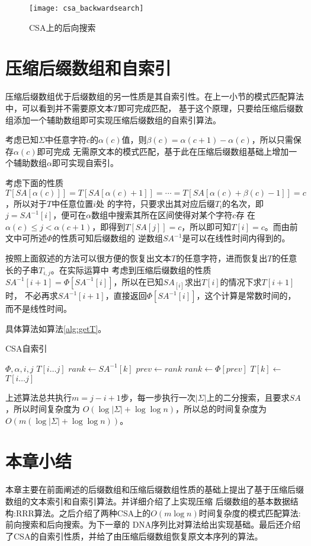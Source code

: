 \begin{figure}[t]
    \centering
    \texttt{[image: csa\_backwardsearch]}
    \caption{CSA上的后向搜索}
    \label{figbackwardsearch}
\end{figure}

\section{压缩后缀数组和自索引}
压缩后缀数组优于后缀数组的另一性质是其自索引性。在上一小节的模式匹配算法中，可以看到并不需要原文本$T$即可完成匹配，
基于这个原理，只要给压缩后缀数组添加一个辅助数组即可实现压缩后缀数组的自索引算法。

考虑已知$\Sigma$中任意字符$c$的$\alpha(c)$值，则$\beta(c)=\alpha(c+1)-\alpha(c)$，所以只需保存$\alpha(c)$即可完成
无需原文本的模式匹配，基于此在压缩后缀数组基础上增加一个辅助数组$\alpha$即可实现自索引。

考虑下面的性质$T[SA[\alpha(c)]]=T[SA[\alpha(c)+1]]=\cdots=T[SA[\alpha(c)+\beta(c)-1]]=c$，所以对于$T$中任意位置$i$处
的字符，只要求出其对应后缀$T_i$的名次，即$j=SA^{-1}[i]$，便可在$\alpha$数组中搜索其所在区间使得对某个字符$c$存
在$\alpha(c)\leq j< \alpha(c+1)$，即得到$T[SA[j]]=c$，所以即可知$T[i]=c$。而由前文中可所述$\Phi$的性质可知后缀数组的
逆数组$SA^{-1}$是可以在线性时间内得到的。

按照上面叙述的方法可以很方便的恢复出文本$T$的任意字符，进而恢复出$T$的任意长的子串$T_{i,j}$。在实际运算中
考虑到压缩后缀数组的性质$SA^{-1}[i+1]=\Phi[SA^{-1}[i]]$，所以在已知$SA_[i]$求出$T[i]$的情况下求$T[i+1]$时，
不必再求$SA^{-1}[i+1]$，直接返回$\Phi[SA^{-1}[i]]$，这个计算是常数时间的，而不是线性时间\cite{sadakane2000compressed}。

具体算法如算法\ref{alg:getT}。

\begin{algorithm}[ht]
    \caption{CSA自索引}
    \label{alg:getT}
    \begin{algorithmic}[1]
        \Require $\Phi,\alpha,i,j$
        \Ensure $T[i\ldots j]$
                \State $rank \gets SA^{-1}[k]$
                \State $prev \gets rank$
            \Else
                \State $rank \gets \Phi[prev]$
            \EndIf
            \State $T[k] \gets$ 
        \EndFor
        \State \Return $T[i\ldots j]$
    \end{algorithmic}
\end{algorithm}

上述算法总共执行$m=j-i+1$步，每一步执行一次$|\Sigma|$上的二分搜索，且要求$SA$，所以时间复杂度为
$O(\log |\Sigma|+\log \log n)$，所以总的时间复杂度为$O(m(\log |\Sigma|+\log \log n))$。

\section{本章小结}
本章主要在前面阐述的后缀数组和压缩后缀数组性质的基础上提出了基于压缩后缀数组的文本索引和自索引算法。并详细介绍了上实现压缩
后缀数组的基本数据结构:RRR算法。之后介绍了两种CSA上的$O(m\log n)$时间复杂度的模式匹配算法:前向搜索和后向搜索。为下一章的
DNA序列比对算法给出实现基础。最后还介绍了CSA的自索引性质，并给了由压缩后缀数组恢复原文本序列的算法。
